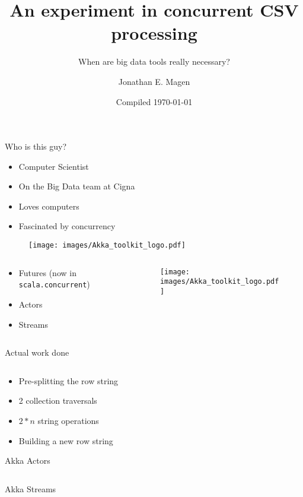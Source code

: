 \documentclass[aspectratio=169]{beamer}
\title{An experiment in concurrent CSV processing}
\subtitle{When are big data tools really necessary?}
\author{Jonathan E. Magen}
\date{Compiled \today}
\begin{document}
\frame{\titlepage}

\begin{frame}{Who is this guy?}
  \begin{itemize}
  \item Computer Scientist
  \item On the Big Data team at Cigna
  \item Loves computers
  \item Fascinated by concurrency
  \end{itemize}
\end{frame}

\begin{frame}
  \begin{figure}
    \texttt{[image: images/Akka\_toolkit\_logo.pdf]}
  \end{figure}
\end{frame}

\begin{frame}
  \begin{columns}[c]
    \begin{column}{0.5\textwidth}
      \begin{itemize}
      \item Futures (now in \texttt{scala.concurrent})
      \item Actors
      \item Streams
      \end{itemize}
    \end{column}

    \begin{column}{0.5\textwidth}
      \begin{figure}
        \texttt{[image: images/Akka\_toolkit\_logo.pdf]}
      \end{figure}
    \end{column}
  \end{columns}
\end{frame}

\begin{frame}[fragile]{Actual work done}

  \inputminted{scala}{snippets/process.scala}

  \begin{itemize}
    \item Pre-splitting the row string
    \item 2 collection traversals
    \item $2*n$ string operations
    \item Building a new row string
  \end{itemize}
\end{frame}

\begin{frame}[fragile]{Akka Actors}
  \inputminted{scala}{snippets/actors.scala}
\end{frame}

\begin{frame}[fragile]{Akka Streams}
  \inputminted{scala}{snippets/streams.scala}
\end{frame}
\end{document}
